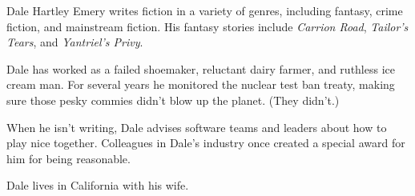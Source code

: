 
\noindent
Dale Hartley Emery
writes fiction in a variety of genres,
including fantasy, crime fiction, and mainstream fiction.
His fantasy stories include
\emph{Carrion Road},
\emph{Tailor's Tears},
and \emph{Yantriel's Privy}.

Dale has worked as a failed shoemaker,
reluctant dairy farmer,
and ruthless ice cream man.
For several years
he monitored the nuclear test ban treaty,
making sure those pesky commies didn't blow up the planet.
(They didn't.)

When he isn't writing,
Dale advises software teams and leaders
about how to play nice together.
Colleagues in Dale's industry
once created a special award for him
for being reasonable.

Dale lives in California with his wife.
